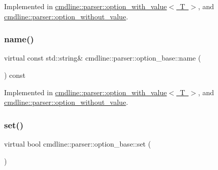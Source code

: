 Implemented in \mbox{\hyperlink{classcmdline_1_1parser_1_1option__with__value_a3dd668a7784eaa1fdeac77367c81f489}{cmdline\+::parser\+::option\+\_\+with\+\_\+value$<$ T $>$}}, and \mbox{\hyperlink{classcmdline_1_1parser_1_1option__without__value_a57b95fab703aba31c702697ab25c9316}{cmdline\+::parser\+::option\+\_\+without\+\_\+value}}.

\mbox{\label{classcmdline_1_1parser_1_1option__base_a30b43cdce34669f4cbc7de9d506416e7}} 
\subsubsection{\texorpdfstring{name()}{name()}}
{\footnotesize\ttfamily virtual const std\+::string\& cmdline\+::parser\+::option\+\_\+base\+::name (\begin{DoxyParamCaption}{ }\end{DoxyParamCaption}) const\hspace{0.3cm}{\ttfamily [pure virtual]}}



Implemented in \mbox{\hyperlink{classcmdline_1_1parser_1_1option__with__value_a37a101909b8d912d9cab296be19328da}{cmdline\+::parser\+::option\+\_\+with\+\_\+value$<$ T $>$}}, and \mbox{\hyperlink{classcmdline_1_1parser_1_1option__without__value_a3b163022cec8a3e3cf816ea70a36abd4}{cmdline\+::parser\+::option\+\_\+without\+\_\+value}}.

\mbox{\label{classcmdline_1_1parser_1_1option__base_a6729965a4221ba0112ca04f8550fce5c}} 
\subsubsection{\texorpdfstring{set()}{set()}\hspace{0.1cm}{\footnotesize\ttfamily [1/2]}}
{\footnotesize\ttfamily virtual bool cmdline\+::parser\+::option\+\_\+base\+::set (\begin{DoxyParamCaption}{ }\end{DoxyParamCaption})\hspace{0.3cm}{\ttfamily [pure virtual]}}



